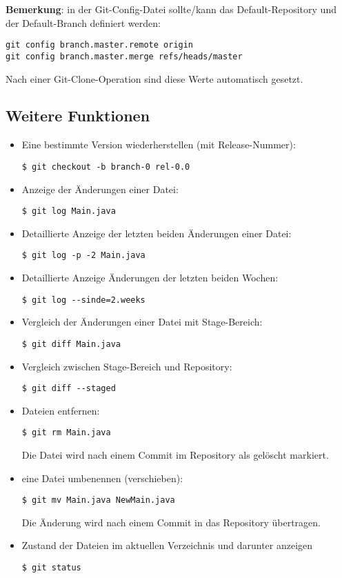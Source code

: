 {\bfseries Bemerkung}: in der Git-Config-Datei sollte/kann das Default-Repository
und der Default-Branch definiert werden:
  \begin{lstlisting}
git config branch.master.remote origin
git config branch.master.merge refs/heads/master
  \end{lstlisting}
Nach einer Git-Clone-Operation sind diese Werte automatisch gesetzt.
%
\subsection{Weitere Funktionen}
\begin{itemize}
\item Eine bestimmte Version wiederherstellen (mit Release-Nummer):
  \begin{lstlisting}
$ git checkout -b branch-0 rel-0.0
  \end{lstlisting}
\item Anzeige der Änderungen einer Datei:
\begin{lstlisting}
$ git log Main.java
\end{lstlisting}
\item Detaillierte Anzeige der letzten beiden Änderungen einer Datei:
\begin{lstlisting}
$ git log -p -2 Main.java
\end{lstlisting}
\item Detaillierte Anzeige Änderungen der letzten beiden Wochen:
\begin{lstlisting}
$ git log --sinde=2.weeks
\end{lstlisting}
\item Vergleich der Änderungen einer Datei mit Stage-Bereich:
\begin{lstlisting}
$ git diff Main.java
\end{lstlisting}
\item Vergleich zwischen Stage-Bereich und Repository:
\begin{lstlisting}
$ git diff --staged
\end{lstlisting}
\item Dateien entfernen:
\begin{lstlisting}
$ git rm Main.java
\end{lstlisting}
Die Datei wird nach einem Commit im Repository als gelöscht markiert.
\item eine Datei umbenennen (verschieben):
\begin{lstlisting}
$ git mv Main.java NewMain.java
\end{lstlisting}
Die Änderung wird nach einem Commit in das Repository übertragen.
\item Zustand der Dateien im aktuellen Verzeichnis und darunter anzeigen
\begin{lstlisting}
$ git status
\end{lstlisting}
\end{itemize}
